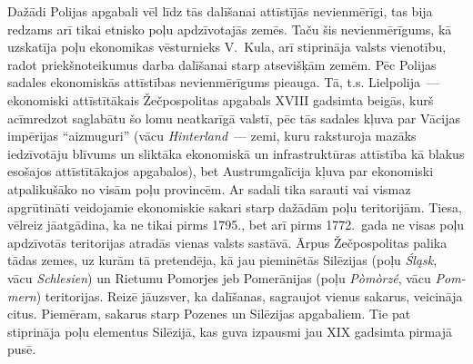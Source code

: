 \documentclass[twoside,a5paper,12pt,fleqn,openany]{extbook}
\newcommand{\pltxti}[1]{\textit{\textpolish{#1}}}
\newcommand{\detxti}[1]{\textit{\textgerman{#1}}}
\begin{document}
Dažādi Polijas apgabali vēl līdz tās dalīšanai attīstījās nevienmērīgi, tas bija redzams arī tikai etnisko poļu apdzīvotajās zemēs. Taču šis nevienmērīgums, kā uzskatīja poļu ekonomikas vēsturnieks V.~Kula, arī stiprināja valsts vienotību, radot priekšnoteikumus darba dalīšanai starp atsevišķām zemēm. Pēc Polijas sadales ekonomiskās attīstības nevienmērīgums pieauga. Tā, t.s. Lielpolija~--- ekonomiski attīstītākais Žečpospolitas apgabals XVIII gadsimta beigās, kurš acīmredzot saglabātu šo lomu neatkarīgā valstī, pēc tās sadales kļuva par Vācijas impērijas ``aizmuguri'' (vācu \detxti{Hinterland}~--- zemi, kuru raksturoja mazāks iedzīvotāju blīvums un sliktāka ekonomiskā un infrastruktūras attīstība kā blakus esošajos attīstītākajos apgabalos), bet Austrumgalīcija kļuva par ekonomiski atpalikušāko no visām poļu provincēm. Ar sadali tika sarauti vai vismaz apgrūtināti veidojamie ekonomiskie sakari starp dažādām poļu teritorijām. Tiesa, vēlreiz jāatgādina, ka ne tikai pirms 1795., bet arī pirms 1772.~gada ne visas poļu apdzīvotās teritorijas atradās vienas valsts sastāvā. Ārpus Žečpospolitas palika tādas zemes, uz kurām tā pretendēja, kā jau pieminētās Silēzijas (poļu \pltxti{Śląsk}, vācu \detxti{Schlesien}) un Rietumu Pomorjes jeb Pomerānijas (poļu \pltxti{Pòmòrzé}, vācu \detxti{Pommern}) teritorijas. Reizē jāuzsver, ka dalīšanas, sagraujot vienus sakarus, veicināja citus. Piemēram, sakarus starp Pozenes un Silēzijas apgabaliem. Tie pat stiprināja poļu elementus Silēzijā, kas guva izpausmi jau XIX gadsimta pirmajā pusē.
\end{document}
